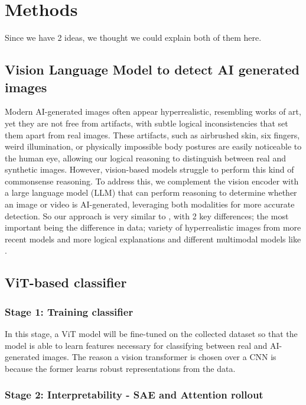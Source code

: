 \documentclass[10pt,twocolumn,letterpaper]{article}
\begin{document}
\section{Methods}
Since we have 2 ideas, we thought we could explain both of them here.

\subsection{Vision Language Model to detect AI generated images}
Modern AI-generated images often appear hyperrealistic, resembling works of art, yet they are not free from artifacts, with subtle logical inconsistencies that set them apart from real images. These artifacts, such as airbrushed skin, six fingers, weird illumination, or physically impossible body postures are easily noticeable to the human eye, allowing our logical reasoning to distinguish between real and synthetic images. However, vision-based models struggle to perform this kind of commonsense reasoning. To address this, we complement  the vision encoder with a large language model (LLM) that can perform reasoning to determine whether an image or video is AI-generated, leveraging both modalities for more accurate detection. So our approach is very similar to \cite{zhangCommonSenseReasoning2025}, with 2 key differences; the most important being the difference in data; variety of hyperrealistic images from more recent models and more logical explanations and different multimodal models like \cite{steiner2024paligemma2familyversatile, abdin2024phi3technicalreporthighly, chen2024far, chen2024internvl}. 

\subsection{ViT-based classifier}
\subsubsection{Stage 1: Training classifier}
\label{subsubsec:vit-training}
In this stage, a ViT model \cite{dosovitskiyImageWorth16x162021} will be fine-tuned on the collected dataset so that the model is able to learn features necessary for classifying between real and AI-generated images. The reason a vision transformer is chosen over a CNN is because the former learns robust representations from the data.

\subsubsection{Stage 2: Interpretability - SAE and Attention rollout}
\end{document}

